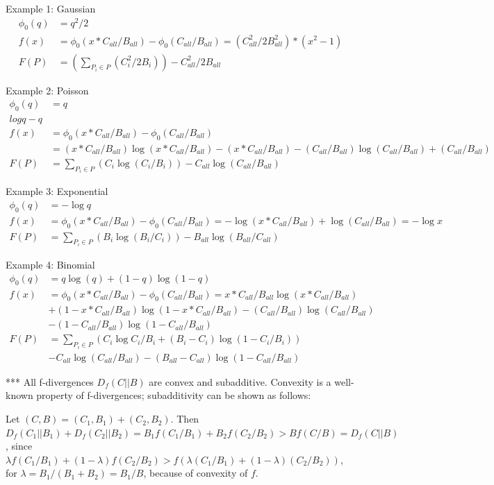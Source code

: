 \documentclass{article}
\theoremstyle{case}
\begin{document}
Example 1: Gaussian
\begin{align*}
\phi_0(q) &= q^2 / 2 \\
f(x) &= \phi_0(x*C_{all}/B_{all}) - \phi_0(C_{all}/B_{all}) = (C_{all}^2/2B_{all}^2)*(x^2-1) \\
F(P) &= (\sum_{P_i \in P} (C_i^2 / 2B_i)) - C_{all}^2 / 2B_{all}
\end{align*}


Example 2: Poisson
\begin{align*}
\phi_0(q) &= q \\log q - q \\
f(x) &= \phi_0(x*C_{all}/B_{all}) - \phi_0(C_{all}/B_{all}) \\
&= (x*C_{all}/B_{all}) \log (x*C_{all}/B_{all}) - (x*C_{all}/B_{all}) -
(C_{all}/B_{all}) \log (C_{all}/B_{all}) + (C_{all}/B_{all}) \\
F(P) &= \sum_{P_i \in P} (C_i \log (C_i/B_i)) - C_{all} \log (C_{all}/B_{all})
\end{align*}

Example 3: Exponential
\begin{align*}
\phi_0(q) &= -\log q \\
f(x) &= \phi_0(x*C_{all}/B_{all}) - \phi_0(C_{all}/B_{all}) = -\log(x*C_{all}/B_{all}) + \log(C_{all}/B_{all}) = -\log x \\
F(P) &= \sum_{P_i \in P} (B_i \log (B_i/C_i)) - B_{all} \log (B_{all}/C_{all})
\end{align*}

Example 4: Binomial
\begin{align*}
\phi_0(q) &= q \log(q) + (1-q) \log (1-q) \\
f(x) &= \phi_0(x*C_{all}/B_{all}) - \phi_0(C_{all}/B_{all}) = x*C_{all}/B_{all} \log (x*C_{all}/B_{all}) \\
&+ (1-x*C_{all}/B_{all}) \log (1-x*C_{all}/B_{all}) - (C_{all}/B_{all}) \log (C_{all}/B_{all}) \\
&- (1-C_{all}/B_{all}) \log (1-C_{all}/B_{all}) \\
F(P) &= \sum_{P_i \in P} (C_i \log C_i/B_i + (B_i-C_i) \log (1-C_i/B_i)) \\
&- C_{all} \log (C_{all}/B_{all}) - (B_{all}-C_{all}) \log (1-C_{all}/B_{all})
\end{align*}

*** All f-divergences $D_f(C || B)$ are convex and subadditive.  Convexity is a well-known property of f-divergences; subadditivity can be shown as follows:

Let $(C,B) = (C_1,B_1) + (C_2,B_2)$.
Then $D_f(C_1 || B_1) + D_f(C_2 || B_2) = B_1 f(C_1/B_1) + B_2 f(C_2/B_2) > B f(C/B) = D_f(C || B)$,
since $\lambda f(C_1/B_1) + (1-\lambda) f(C_2/B_2) > f(\lambda(C_1/B_1) + (1-\lambda)(C_2/B_2))$,
for $\lambda = B_1 / (B_1 + B_2) = B_1 / B$, because of convexity of $f$.
\end{document}
